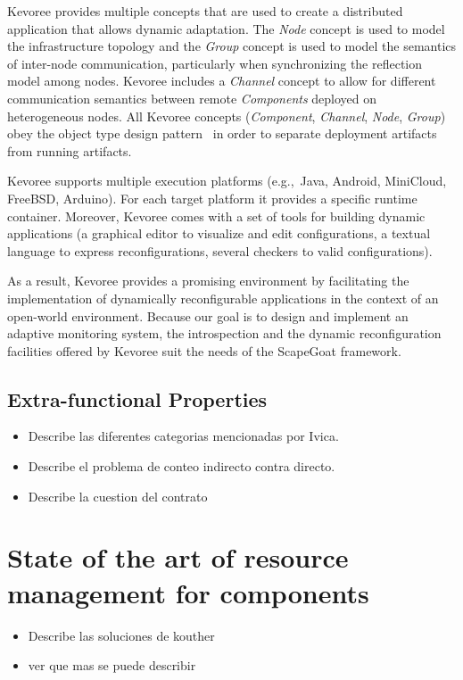 Kevoree provides multiple concepts that are used to create a distributed application that allows dynamic adaptation. The \emph{Node} concept is used to model the infrastructure topology and the \emph{Group} concept is used to model the semantics of inter-node communication, particularly when synchronizing the reflection model among nodes. 
Kevoree includes a \emph{Channel} concept to allow for different communication semantics between remote \emph{Components} deployed on heterogeneous nodes. 
All Kevoree concepts (\textit{Component}, \textit{Channel}, \textit{Node}, \textit{Group}) obey the object type design pattern~\cite{johnson_type_1997} in order to separate deployment artifacts from running artifacts.  

Kevoree supports multiple execution platforms (e.g.,~Java, Android, MiniCloud, FreeBSD, Arduino). For each target platform it provides a specific runtime container. 
Moreover, Kevoree comes with a set of tools for building dynamic applications (a graphical editor to visualize and edit configurations, a textual language to express reconfigurations, several checkers to valid configurations). 

As a result, Kevoree provides a promising environment by facilitating the implementation of dynamically reconfigurable applications in the context of an open-world environment.
Because our goal is to design and implement an adaptive monitoring system, the introspection and the dynamic reconfiguration facilities offered by Kevoree suit the needs of the ScapeGoat framework.


\subsection{Extra-functional Properties}
\begin{itemize}
\item Describe las diferentes categorias mencionadas por Ivica.
\item Describe el problema de conteo indirecto contra directo.
\item Describe la cuestion del contrato
\end{itemize}
\section{State of the art of resource management for components} \label{sec:component-leverage}
\begin{itemize}
\item Describe las soluciones de kouther
\item ver que mas se puede describir
\end{itemize}

